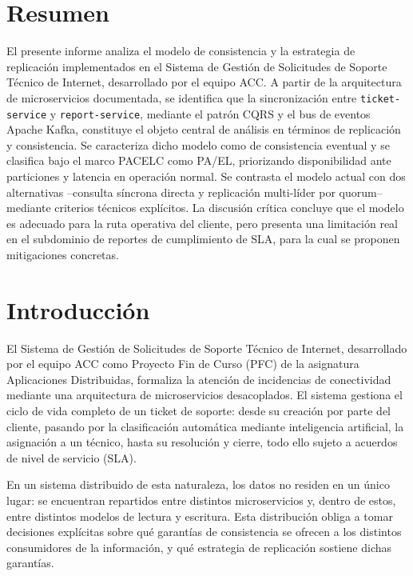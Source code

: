 \documentclass[12pt, a4paper]{article}
\begin{document}
\section*{Resumen}
El presente informe analiza el modelo de consistencia y la estrategia de replicación implementados en el Sistema de Gestión de Solicitudes de Soporte Técnico de Internet, desarrollado por el equipo ACC. A partir de la arquitectura de microservicios documentada, se identifica que la sincronización entre \texttt{ticket-service} y \texttt{report-service}, mediante el patrón CQRS y el bus de eventos Apache Kafka, constituye el objeto central de análisis en términos de replicación y consistencia. Se caracteriza dicho modelo como de consistencia eventual y se clasifica bajo el marco PACELC como PA/EL, priorizando disponibilidad ante particiones y latencia en operación normal. Se contrasta el modelo actual con dos alternativas --consulta síncrona directa y replicación multi-líder por quorum-- mediante criterios técnicos explícitos. La discusión crítica concluye que el modelo es adecuado para la ruta operativa del cliente, pero presenta una limitación real en el subdominio de reportes de cumplimiento de SLA, para la cual se proponen mitigaciones concretas.

\vspace{0.5cm}

\section{Introducción}
El Sistema de Gestión de Solicitudes de Soporte Técnico de Internet, desarrollado por el equipo ACC como Proyecto Fin de Curso (PFC) de la asignatura Aplicaciones Distribuidas, formaliza la atención de incidencias de conectividad mediante una arquitectura de microservicios desacoplados. El sistema gestiona el ciclo de vida completo de un ticket de soporte: desde su creación por parte del cliente, pasando por la clasificación automática mediante inteligencia artificial, la asignación a un técnico, hasta su resolución y cierre, todo ello sujeto a acuerdos de nivel de servicio (SLA).

En un sistema distribuido de esta naturaleza, los datos no residen en un único lugar: se encuentran repartidos entre distintos microservicios y, dentro de estos, entre distintos modelos de lectura y escritura. Esta distribución obliga a tomar decisiones explícitas sobre qué garantías de consistencia se ofrecen a los distintos consumidores de la información, y qué estrategia de replicación sostiene dichas garantías.
\end{document}

